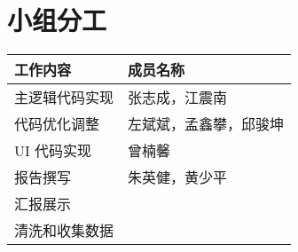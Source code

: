 \documentclass[12pt,hyperref,a4paper,UTF8]{ctexart}
\begin{document}
\section{小组分工}
\begin{longtable}{>{\centering\arraybackslash}p{} >{\centering\arraybackslash}p{}} %
    \toprule
    \textbf{工作内容} & \textbf{成员名称} \\ %
    \midrule
    主逻辑代码实现 & 张志成，江震南 \\
    代码优化调整 & 左斌斌，孟鑫攀，邱骏坤​ \\
    UI 代码实现 & 曾楠馨 \\
    报告撰写 & 朱英健，黄少平 \\
    汇报展示 &  \\
    清洗和收集数据 &  \\
    \bottomrule
\end{longtable}


\end{document}
